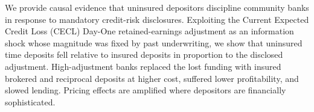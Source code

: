 We provide causal evidence that uninsured depositors discipline community
banks in response to mandatory credit-risk disclosures.  Exploiting the
Current Expected Credit Loss (CECL) Day-One retained-earnings adjustment
as an information shock whose magnitude was fixed by past underwriting,
we show that uninsured time deposits fell relative to insured deposits
in proportion to the disclosed adjustment.  High-adjustment banks
replaced the lost funding with insured brokered and reciprocal deposits
at higher cost, suffered lower profitability, and slowed lending.
Pricing effects are amplified where depositors are financially
sophisticated.
